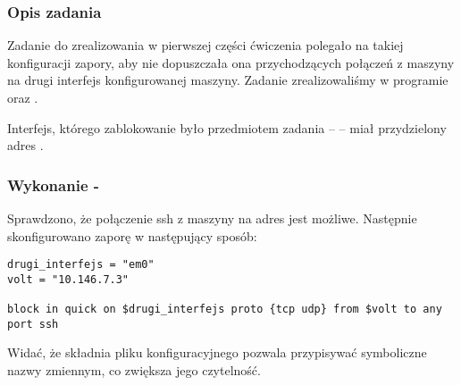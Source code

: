 \subsubsection{Opis zadania}
Zadanie do zrealizowania w pierwszej części ćwiczenia polegało na takiej konfiguracji zapory, aby nie dopuszczała ona przychodzących połączeń \ssh{} z maszyny \volt{} na drugi interfejs konfigurowanej maszyny.
Zadanie zrealizowaliśmy w programie \ipfw{} oraz \pf.


Interfejs, którego zablokowanie było przedmiotem zadania -- \emo{} -- miał przydzielony adres \emoip{}.


\subsubsection{Wykonanie - \pf{}}
\label{ss2:pf}
Sprawdzono, że połączenie ssh z maszyny \volt{} na adres \emoip{} jest możliwe.
Następnie skonfigurowano zaporę \pf{} w następujący sposób:

\begin{lstlisting}[caption={\texttt{/etc/pf.conf}},label=pfconf]
drugi_interfejs = "em0"
volt = "10.146.7.3"

block in quick on $drugi_interfejs proto {tcp udp} from $volt to any port ssh
\end{lstlisting}

Widać, że składnia pliku konfiguracyjnego \pf{} pozwala przypisywać symboliczne nazwy zmiennym, co zwiększa jego czytelność.

